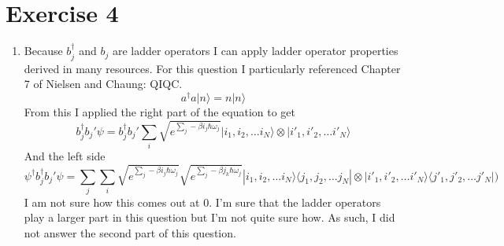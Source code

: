 \documentclass[12pt]{article}
\newcommand{\ket}[1]{\vert{#1}\rangle}
\begin{document}
\section{Exercise 4}
\begin{enumerate}
    \item Because $b_j^{\dagger}$ and $b_j$ are ladder operators I can apply ladder operator properties derived in many resources. For this question I particularly referenced Chapter 7 of Nielsen and Chaung: QIQC. 
    $$ a^{\dagger} a \ket{n} = n \ket{n} $$
    From this I applied the right part of the equation to get 
    $$ b_j^{\dagger} b_j' \psi =  b_j^{\dagger} b_j' \sum_i \sqrt{e^{\sum_j - \beta i_j \hbar \omega_j }} | i_1, i_2, \ldots i_N \rangle \otimes |i'_1, i'_2, \ldots i'_N \rangle $$
    And the left side 
    $$ \psi^{\dagger} b_j^{\dagger} b_j' \psi = \sum_j \sum_i \sqrt{e^{\sum_j - \beta i_j \hbar \omega_j }} \sqrt{e^{\sum_j - \beta j_k \hbar \omega_j }} |i_1, i_2, \ldots i_N \rangle \langle j_1, j_2, \ldots j_N | \otimes | i'_1, i'_2, \ldots i'_N \rangle \langle j'_1, j'_2, \ldots j'_N |  \Big) $$
    I am not sure how this comes out at 0. I'm sure that the ladder operators play a larger part in this question but I'm not quite sure how. As such, I did not answer the second part of this question. 
\end{enumerate}
\end{document}
